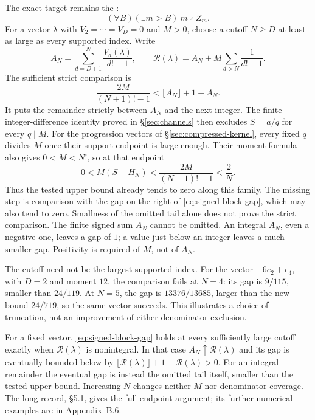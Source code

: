 \documentclass[11pt]{article}
\begin{document}
The exact target remains the
:
\begin{equation}
(\forall B)(\exists m>B)\ m\nmid Z_m.
\label{eq:canonical-open-target}
\end{equation}
For a vector $\lambda$ with $V_2=\cdots=V_D=0$ and $M>0$, choose a
cutoff $N\ge D$ at least as large as every supported index. Write
\[
A_N=\sum_{d=D+1}^N\frac{V_d(\lambda)}{d!-1},\qquad
\mathcal R(\lambda)=A_N+M\sum_{d>N}\frac1{d!-1}.
\]
The sufficient strict comparison is
\begin{equation}
\frac{2M}{(N+1)!-1}<\lfloor A_N\rfloor+1-A_N.
\label{eq:signed-block-gap}
\end{equation}
It puts the remainder strictly between $A_N$ and the next integer.
The finite integer-difference identity proved in \S\ref{sec:channels}
then excludes $S=a/q$ for every $q\mid M$. For the progression vectors of
\S\ref{sec:compressed-kernel}, every fixed $q$ divides $M$ once their
support endpoint is large enough. Their moment formula also gives
$0<M<N!$, so at that endpoint
\[
 0<M(S-H_N)<\frac{2M}{(N+1)!-1}<\frac2N.
\]
Thus the tested upper bound already tends to zero along this family.
The missing step is comparison with the gap on the right of
\eqref{eq:signed-block-gap}, which may also tend to zero. Smallness of
the omitted tail alone does not prove the strict comparison.
The finite signed sum $A_N$ cannot be omitted. An integral $A_N$, even a
negative one, leaves a gap of $1$; a value just below an integer leaves
a much smaller gap. Positivity is required of $M$, not of $A_N$.

The cutoff need not be the largest supported index. For the vector
$-6e_2+e_4$, with $D=2$ and moment $12$, the comparison fails at $N=4$:
its gap is $9/115$, smaller than $24/119$. At $N=5$, the gap is
$13376/13685$, larger than the new bound $24/719$, so the same vector
succeeds. This illustrates a choice of truncation, not an improvement
of either denominator exclusion.

For a fixed vector, \eqref{eq:signed-block-gap} holds at every sufficiently
large cutoff exactly when $\mathcal R(\lambda)$ is nonintegral. In that
case $A_N\uparrow\mathcal R(\lambda)$ and its gap is eventually bounded
below by $\lfloor\mathcal R(\lambda)\rfloor+1-\mathcal R(\lambda)>0$.
For an integral remainder the eventual gap is instead the omitted tail
itself, smaller than the tested upper bound. Increasing $N$ changes
neither $M$ nor denominator coverage. The long record, \S5.1, gives the
full endpoint argument; its further numerical examples are in Appendix~B.6.
\end{document}
